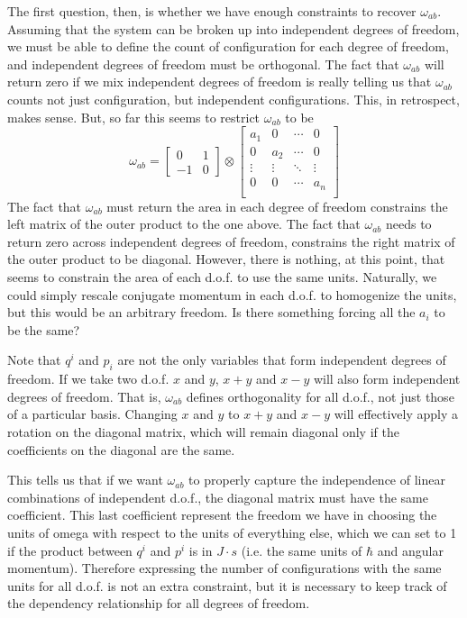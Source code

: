 The first question, then, is whether we have enough constraints to recover $\omega_{ab}$. Assuming that the system can be broken up into independent degrees of freedom, we must be able to define the count of configuration for each degree of freedom, and independent degrees of freedom must be orthogonal. The fact that $\omega_{ab}$ will return zero if we mix independent degrees of freedom is really telling us that $\omega_{ab}$ counts not just configuration, but independent configurations. This, in retrospect, makes sense. But, so far this seems to restrict $\omega_{ab}$ to be
\begin{equation}
	\omega_{ab} = \left[\begin{array}{cc}
		0 & 1 \\
		-1 & 0 
	\end{array} \right] \otimes   \left[ {\begin{array}{cccc}
		a_{1} & 0 & \cdots & 0\\
		0 & a_{2} & \cdots & 0\\
		\vdots & \vdots & \ddots & \vdots\\
		0 & 0 & \cdots & a_{n}\\
\end{array} } \right]
\end{equation}
The fact that $\omega_{ab}$ must return the area in each degree of freedom constrains the left matrix of the outer product to the one above. The fact that $\omega_{ab}$ needs to return zero across independent degrees of freedom, constrains the right matrix of the outer product to be diagonal. However, there is nothing, at this point, that seems to constrain the area of each d.o.f. to use the same units. Naturally, we could simply rescale conjugate momentum in each d.o.f. to homogenize the units, but this would be an arbitrary freedom. Is there something forcing all the $a_i$ to be the same?

Note that $q^i$ and $p_i$ are not the only variables that form independent degrees of freedom. If we take two d.o.f. $x$ and $y$, $x+y$ and $x-y$ will also form independent degrees of freedom. That is, $\omega_{ab}$ defines orthogonality for all d.o.f., not just those of a particular basis. Changing $x$ and $y$ to $x+y$ and $x-y$ will effectively apply a rotation on the diagonal matrix, which will remain diagonal only if the coefficients on the diagonal are the same.

This tells us that if we want $\omega_{ab}$ to properly capture the independence of linear combinations of independent d.o.f., the diagonal matrix must have the same coefficient. This last coefficient represent the freedom we have in choosing the units of omega with respect to the units of everything else, which we can set to 1 if the product between $q^i$ and $p^i$ is in $J\cdot s$ (i.e. the same units of $\hbar$ and angular momentum). Therefore expressing the number of configurations with the same units for all d.o.f. is not an extra constraint, but it is necessary to keep track of the dependency relationship for all degrees of freedom.

